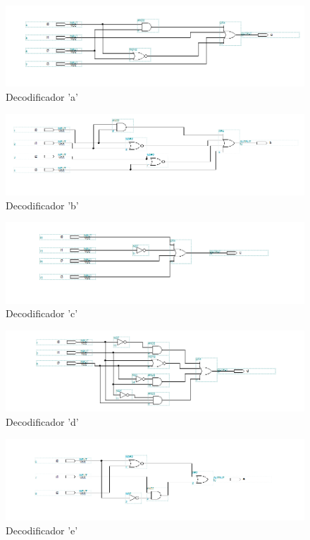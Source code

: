 \documentclass[a4paper]{article}
\begin{document}
\begin{figure}[h!]
  \centering
  \includegraphics[scale=0.7]{dec_a.png}
  \caption{Decodificador 'a'}
\end{figure}

\begin{figure}[h!]
  \centering
  \includegraphics[scale=0.7]{dec_b.png}
  \caption{Decodificador 'b'}
\end{figure}

\begin{figure}[h!]
  \centering
  \includegraphics[scale=0.7]{dec_c.png}
  \caption{Decodificador 'c'}
\end{figure}

\begin{figure}[h!]
  \centering
  \includegraphics[scale=0.7]{dec_d.png}
  \caption{Decodificador 'd'}
\end{figure}

\begin{figure}[h!]
  \centering
  \includegraphics[scale=0.7]{dec_e.png}
  \caption{Decodificador 'e'}
\end{figure}
\end{document}
